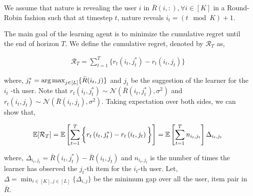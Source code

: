 \begin{assumption}
\label{assm:round-robin}
We assume that nature is revealing the user $i$ in $\bar{R}(i,:), \forall i\in [K]$  in a Round-Robin fashion such that at timestep $t$, nature reveals $i_t = (t \mod K) + 1$.
\end{assumption}

The main goal of the learning agent is to minimize the cumulative regret until the end of horizon $T$. We define the cumulative regret, denoted by $\mathcal{R}_T$ as,

\begin{align*}
\mathcal{R}_T = \sum_{t=1}^{T}\bigg\lbrace r_{t}\left(i_t, j^*_t \right) - r_{t}\left( i_t, j_{t}\right)\bigg\rbrace
\end{align*}

where, $j^*_t = \mathop{\rm arg\,max}_{j\in [L]}\lbrace \bar{R}(i_t,j)\rbrace$ and $j_t$ be the suggestion of the learner for the $i_t$ -th user. Note that $r_{t}\left(i_t, j^*_t \right)\sim \mathcal{N}(\bar{R}\left(i_t, j^*_t \right),\sigma^2)$ and $r_{t}\left(i_t, j_t \right)\sim \mathcal{N}(\bar{R}\left(i_t, j_t \right), \sigma^2)$. Taking expectation over both sides, we can show that,

\begin{align*}
\mathbb{E}[\mathcal{R}_T] = \mathbb{E}\left [ \sum_{t=1}^{T}\bigg\lbrace r_{t}\left(i_t, j^*_t \right) - r_{t}\left( i_t, j_{t}\right)\bigg\rbrace\right] = \mathbb{E}\left [ \sum_{t=1}^{T}  n_{i_t,j_t} \right ]\Delta_{i_t,j_t}
\end{align*}

where, $\Delta_{i_t,j_t} = \bar{R}(i_t,j^*_t) - \bar{R}(i_t,j_t)$ and $n_{i_t,j_t}$ is the number of times the learner has observed the $j_t$-th item for the $i_t$-th user. Let, $\Delta = \min_{i\in[K],j\in[L]}\lbrace \Delta_{i,j}\rbrace$ be the minimum gap over all the user, item pair in $\bar{R}$.
